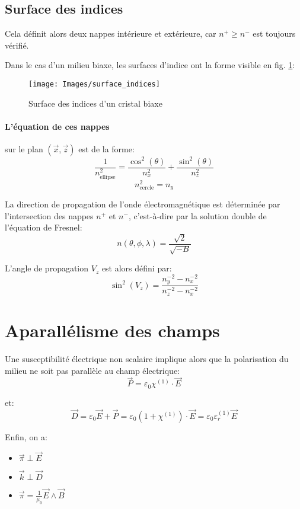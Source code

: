 \documentclass[a4paper,11pt]{report}
\begin{document}
\subsection{Surface des indices}
Cela définit alors deux nappes intérieure et extérieure, car $n^+ \geq n^-$ est toujours vérifié.

Dans le cas d'un milieu biaxe, les surfaces d'indice ont la forme visible en fig. \ref{surf_indices}:

\begin{figure}[h]
    \begin{center}
        \texttt{[image: Images/surface\_indices]}
        \caption{Surface des indices d'un cristal biaxe}
        \label{surf_indices}
    \end{center}
\end{figure}

\paragraph{L'équation de ces nappes} sur le plan $(\vec x, \vec z)$ est de la forme:
\[  \frac{1}{n^2_\text{ellipse}} = \frac{\cos^2(\theta)}{n^2_x} + \frac{\sin^2(\theta)}{n^2_z} \]
\[  n^2_\text{cercle} = n_y \]

La direction de propagation de l'onde électromagnétique est déterminée par l'intersection des nappes $n^+$ et $n^-$, c'est-à-dire par la solution double de l'équation de Fresnel:
\[  n(\theta, \phi, \lambda) = \dfrac{\sqrt 2}{\sqrt{-B}} \]

L'angle de propagation $V_z$ est alors défini par:
\[ \sin^2(V_z) = \frac{n_y^{-2}-n_x^{-2}}{n_z^{-2}-n_x^{-2}} \]


\section{Aparallélisme des champs}
Une susceptibilité électrique non scalaire implique alors que la polarisation du milieu ne soit pas parallèle au champ électrique:
\[\vec{P} = \varepsilon_0 \chi^{(1)} \cdot\vec{E}\]

et: 
\[\vec{D} = \varepsilon_0 \vec{E} + \vec{P}
          = \varepsilon_0 (1+\chi^{(1)}) \cdot\vec{E}
          = \varepsilon_0 \varepsilon_r^{(1)} \vec{E}\]

Enfin, on a:
\begin{itemize}
    \item $\vec{\pi} \perp \vec{E}$
    \item $\vec{k}   \perp \vec{D}$
    \item $\vec{\pi} = \frac{1}{\mu_0} \vec{E}\wedge \vec{B}$
\end{itemize}
\end{document}
